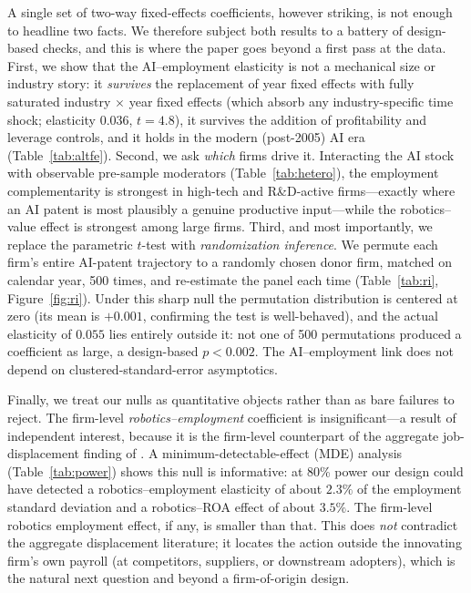 \documentclass[12pt]{article}
\begin{document}
A single set of two-way fixed-effects coefficients, however striking, is not enough to headline
two facts. We therefore subject both results to a battery of design-based checks, and this is
where the paper goes beyond a first pass at the data. First, we show that the AI--employment
elasticity is not a mechanical size or industry story: it \emph{survives} the replacement of year
fixed effects with fully saturated industry $\times$ year fixed effects (which absorb any
industry-specific time shock; elasticity $0.036$, $t=4.8$), it survives the addition of
profitability and leverage controls, and it holds in the modern (post-2005) AI era
(Table~\ref{tab:altfe}). Second, we ask \emph{which} firms drive it. Interacting the AI stock
with observable pre-sample moderators (Table~\ref{tab:hetero}), the employment complementarity is
strongest in high-tech and R\&D-active firms---exactly where an AI patent is most plausibly a
genuine productive input---while the robotics--value effect is strongest among large firms.
Third, and most importantly, we replace the parametric $t$-test with \emph{randomization
inference}. We permute each firm's entire AI-patent trajectory to a randomly chosen donor firm,
matched on calendar year, 500 times, and re-estimate the panel each time (Table~\ref{tab:ri},
Figure~\ref{fig:ri}). Under this sharp null the permutation distribution is centered at zero (its
mean is $+0.001$, confirming the test is well-behaved), and the actual elasticity of $0.055$ lies
entirely outside it: not one of 500 permutations produced a coefficient as large, a design-based
$p<0.002$. The AI--employment link does not depend on clustered-standard-error asymptotics.

Finally, we treat our nulls as quantitative objects rather than as bare failures to reject. The
firm-level \emph{robotics--employment} coefficient is insignificant---a result of independent
interest, because it is the firm-level counterpart of the aggregate job-displacement finding of
\citet{acemoglu2020}. A minimum-detectable-effect (MDE) analysis (Table~\ref{tab:power}) shows
this null is informative: at 80\% power our design could have detected a robotics--employment
elasticity of about $2.3\%$ of the employment standard deviation and a robotics--ROA effect of
about $3.5\%$. The firm-level robotics employment effect, if any, is smaller than that. This does
\emph{not} contradict the aggregate displacement literature; it locates the action outside the
innovating firm's own payroll (at competitors, suppliers, or downstream adopters), which is the
natural next question and beyond a firm-of-origin design.
\end{document}
